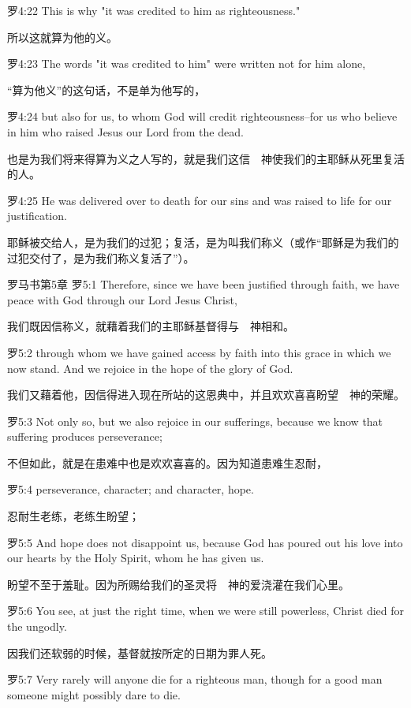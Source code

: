 \documentclass[a4paper,11pt,onecolumn,twoside]{ctexart}
\begin{document}
\begin{multicols}{2}
 罗4:22
 This is why "it was credited to him as righteousness."

 所以这就算为他的义。


 罗4:23
 The words "it was credited to him" were written not for him alone,

 “算为他义”的这句话，不是单为他写的，


 罗4:24
 but also for us, to whom God will credit righteousness--for us who believe in him who raised Jesus our Lord from the dead.

 也是为我们将来得算为义之人写的，就是我们这信　神使我们的主耶稣从死里复活的人。


 罗4:25
 He was delivered over to death for our sins and was raised to life for our justification.

 耶稣被交给人，是为我们的过犯；复活，是为叫我们称义（或作“耶稣是为我们的过犯交付了，是为我们称义复活了”）。


 罗马书第5章
 罗5:1
 Therefore, since we have been justified through faith, we have peace with God through our Lord Jesus Christ,

 我们既因信称义，就藉着我们的主耶稣基督得与　神相和。


 罗5:2
 through whom we have gained access by faith into this grace in which we now stand. And we rejoice in the hope of the glory of God.

 我们又藉着他，因信得进入现在所站的这恩典中，并且欢欢喜喜盼望　神的荣耀。


 罗5:3
 Not only so, but we also rejoice in our sufferings, because we know that suffering produces perseverance;

 不但如此，就是在患难中也是欢欢喜喜的。因为知道患难生忍耐，


 罗5:4
 perseverance, character; and character, hope.

 忍耐生老练，老练生盼望；


 罗5:5
 And hope does not disappoint us, because God has poured out his love into our hearts by the Holy Spirit, whom he has given us.

 盼望不至于羞耻。因为所赐给我们的圣灵将　神的爱浇灌在我们心里。


 罗5:6
 You see, at just the right time, when we were still powerless, Christ died for the ungodly.

 因我们还软弱的时候，基督就按所定的日期为罪人死。


 罗5:7
 Very rarely will anyone die for a righteous man, though for a good man someone might possibly dare to die.


\end{multicols}
\end{document}
